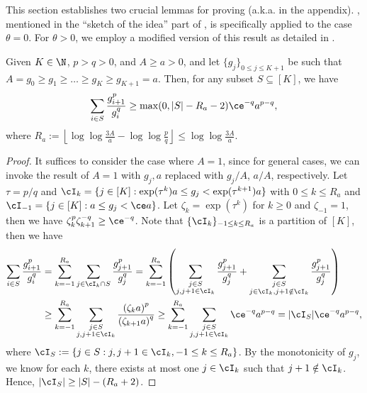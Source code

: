 This section establishes two crucial lemmas for proving  (a.k.a.  in the appendix). 
, mentioned in the ``sketch of the idea'' part of , is  specifically applied to the case  $\theta = 0$.
For $\theta > 0$, we employ a modified version of this result as detailed in .

\begin{lemma}
    \label{lem:accumulated-descent-lower-bound}
    Given $K \in \N$, $p > q > 0$, and $A \geq  a > 0$, and let $\{ g_j \}_{0 \leq j \leq K+1}$ be such that 
    $A = g_0 \geq g_1 \geq \dots \geq g_K \geq g_{K+1} = a$.
    Then, for any subset $S \subseteq [K]$, we have
    \begin{align}
        \sum_{i \in S} \frac{g_{i+1}^p}{g_{i}^q} 
        \geq \max(0, |S| - R_a - 2) \ce^{-q} a^{p-q} 
        ,
        \label{eqn:accumulated-descent-lower-bound}
    \end{align}
    where $R_a := \left \lfloor \log \log \frac{3A}{a} - \log \log \frac{p}{q} \right \rfloor \leq \log \log \frac{3A}{a}$.
\end{lemma}
\begin{proof}
    It suffices to consider the case where $A = 1$, since for general cases, we can invoke the result of $A = 1$ with $g_j, a$ replaced with $g_j / A$, $a / A$, respectively.
    Let $\tau = p/q$ and $\cI_k = \{ j \in [K] : \exp(\tau^{k}) a \leq g_j < \exp(\tau^{k+1}) a \}$ with $0 \leq k \leq R_a$ and $\cI_{-1} = \{ j \in [K] : a \leq g_j < \ce a \}$. 
    Let $\zeta_k = \exp(\tau^k)$ for $k \geq 0$ and $\zeta_{-1} = 1$, then we have $\zeta_k^p \zeta_{k+1}^{-q} \geq \ce^{-q}$.
    Note that $\{ \cI_k \}_{-1 \leq k \leq R_a}$ is a partition of $[K]$, then we have
    \begin{align}
        \sum_{i\in S} \frac{g_{i+1}^p}{g_{i}^q}
        &= 
        \sum_{k=-1}^{R_a} \sum_{j \in \cI_k \cap S} \frac{g_{j+1}^p}{g_{j}^q} 
        = \sum_{k=-1}^{R_a}
        \left(  
         \sum_{\substack{j \in S\\ j,j+1 \in \cI_k}} \frac{g_{j+1}^p}{g_{j}^q} 
         + \sum_{\substack{j \in S \\j \in \cI_k, j+1\notin \cI_k}} \frac{g_{j+1}^p}{g_{j}^q} 
        \right)
         \nonumber\\
        &\geq \sum_{k=-1}^{R_a} 
        \sum_{\substack{j \in S \\j, j+1 \in \cI_k}} \frac{\left( \zeta_k a \right)^p}{\left (\zeta_{k+1}a\right )^q}
        \geq 
        \sum_{k=-1}^{R_a} 
        \sum_{\substack{j \in S \\j, j+1 \in \cI_k}} \ce^{-q}a^{p-q}
        = |\cI_S| \ce^{-q}a^{p-q}
        ,
        \label{eqn:newton-pq-superlinear-penalty}
    \end{align}
    where $\cI_S := \{ j \in S : j, j + 1 \in \cI_k, -1 \leq k \leq R_a \}$.
    By the monotonicity of $g_j$, we know for each $k$, there exists at most one $j \in \cI_k$ such that $j + 1 \notin \cI_k$. 
    Hence, $|\cI_S| \geq |S| - (R_a + 2)$.
\end{proof}

